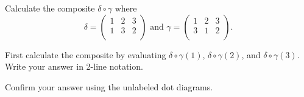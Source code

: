 \begin{exer}[\exerP] %
\label{exer_perm_compose_dg}
    Calculate the composite $\delta \circ \gamma$ where 
        $$\delta = \left ( \begin{array} {ccc} 1 & 2 & 3 \\ 1 & 3 & 2 \\ \end{array} \right ) \text{ and } \gamma= \left ( \begin{array} {ccc} 1 & 2 & 3 \\ 3 & 1 & 2 \\ \end{array} \right ).$$
        \begin{exerpart}
            \item First calculate the composite by evaluating $\delta \circ \gamma(1)$, $\delta \circ \gamma(2)$, and $\delta \circ \gamma(3)$.   Write your answer in 2-line notation.
            \item Confirm your answer using the unlabeled dot diagrams. 
        \end{exerpart}
\end{exer}

